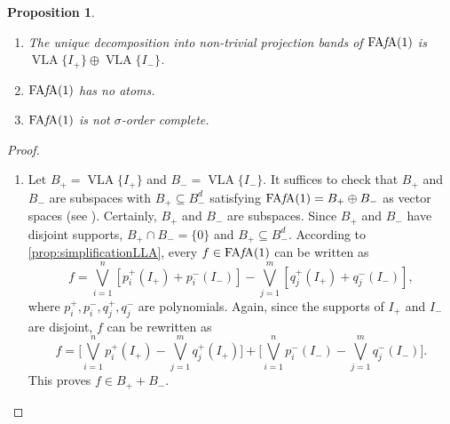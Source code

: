\documentclass{memo-l}
\newtheorem{prop}[theorem]{Proposition}
\theoremstyle{definition}
\theoremstyle{remark}
\numberwithin{section}{chapter}
\numberwithin{equation}{chapter}
\newcommand{\VLA}{\operatorname{VLA}}
\newcommand{\FAFA}[1]{\operatorname{FA{\it f}\!A}(#1)}
\begin{document}
\begin{prop}
    \begin{enumerate}
        \item The unique decomposition into non-trivial projection
            bands of $\FAFA 1$ is $\VLA\{I_+\}\oplus
            \VLA\{I_-\}$.
        \item $\FAFA 1$ has no atoms.
        \item $\FAFA 1$ is not $\sigma $-order complete.
    \end{enumerate}
\end{prop}
\begin{proof}
    \begin{enumerate}
        \item Let $B_+=\VLA\{I_+\}$ and $B_-=\VLA\{I_-\}$. It suffices
            to check that $B_+$ and $B_-$ are subspaces with
            $B_+\subseteq B_-^{d}$ satisfying $\FAFA
            1=B_+\oplus B_-$ as vector spaces (see \cite[Lemma
            1.2.8]{meyer-nieberg1991}). Certainly, $B_+$ and $B_-$ are
            subspaces. Since $B_+$ and $B_-$ have disjoint supports,
            $B_+\cap B_-=\{0\}$ and $B_+ \subseteq B_-^{d}$.
            According to \cref{prop:simplificationLLA}, every $f \in
            \FAFA 1$ can be written as
            \[
                f=\bigvee_{i=1}
                ^{n}[p_i^{+}(I_+)+p_i^{-}(I_-)]-\bigvee_{j=1}^{m}[q_j^{+}(I_+)+q_j^{-}(I_-)],
            \]
            where $p_i^{+},p_i^{-},q_j^{+},q_j^{-}$ are polynomials.
            Again, since the supports of $I_+$ and $I_-$ are disjoint,
            $f$ can be rewritten as
            \[
            f=\bigg[\bigvee_{i=1} ^{n}p_i^{+}(I_+)-\bigvee_{j=1}
            ^{m}q_j^{+}(I_+)\bigg]+\bigg[\bigvee_{i=1} ^{n}p_i^{-}(I_-)-\bigvee_{j=1}
            ^{m}q_j^{-}(I_-)\bigg].
            \]
            This proves $f \in B_+ + B_-$.


\end{enumerate}
\end{proof}
\end{document}
